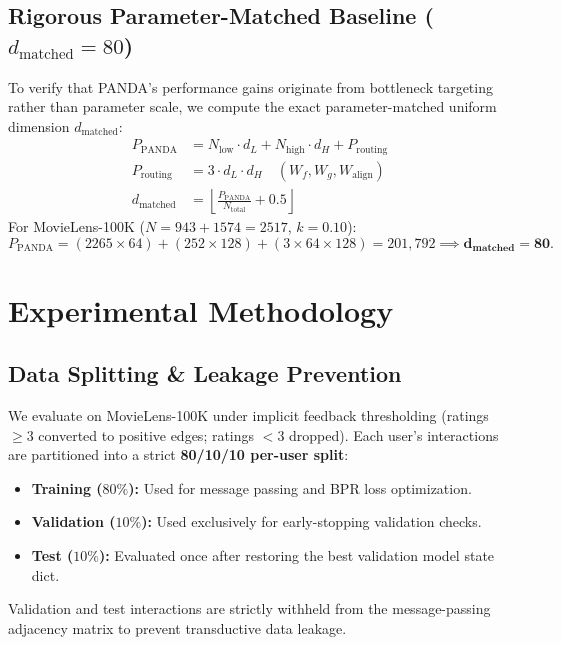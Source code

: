 \documentclass[11pt,a4paper]{article}
\begin{document}
\subsection{Rigorous Parameter-Matched Baseline ($d_{\text{matched}} = 80$)}
To verify that PANDA's performance gains originate from bottleneck targeting rather than parameter scale, we compute the exact parameter-matched uniform dimension $d_{\text{matched}}$:
\begin{align}
    P_{\text{PANDA}} &= N_{\text{low}} \cdot d_L + N_{\text{high}} \cdot d_H + P_{\text{routing}} \\
    P_{\text{routing}} &= 3 \cdot d_L \cdot d_H \quad (W_f, W_g, W_{\text{align}}) \\
    d_{\text{matched}} &= \left\lfloor \frac{P_{\text{PANDA}}}{N_{\text{total}}} + 0.5 \right\rfloor
\end{align}
For MovieLens-100K ($N = 943 + 1574 = 2517$, $k=0.10$):
\begin{equation}
    P_{\text{PANDA}} = (2265 \times 64) + (252 \times 128) + (3 \times 64 \times 128) = 201,792 \implies \mathbf{d_{\text{matched}} = 80}.
\end{equation}

\section{Experimental Methodology}

\subsection{Data Splitting \& Leakage Prevention}
We evaluate on MovieLens-100K under implicit feedback thresholding (ratings $\ge 3$ converted to positive edges; ratings $< 3$ dropped). Each user's interactions are partitioned into a strict \textbf{80/10/10 per-user split}:
\begin{itemize}
    \item \textbf{Training ($80\%$):} Used for message passing and BPR loss optimization.
    \item \textbf{Validation ($10\%$):} Used exclusively for early-stopping validation checks.
    \item \textbf{Test ($10\%$):} Evaluated once after restoring the best validation model state dict.
\end{itemize}
Validation and test interactions are strictly withheld from the message-passing adjacency matrix to prevent transductive data leakage.
\end{document}
